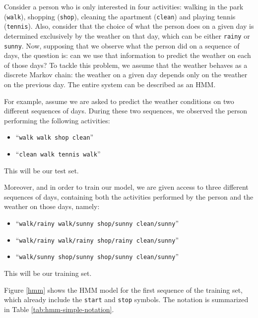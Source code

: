 \begin{example}

Consider a person who is only interested in four activities: walking in the park ({\tt walk}), shopping ({\tt shop}), cleaning the apartment ({\tt clean}) and playing tennis ({\tt tennis}).
Also, consider that the choice of what the person does on a given day is determined exclusively by the weather on that day, which can be either {\tt rainy} or {\tt sunny}. 
Now, supposing that we observe what the person did on a sequence of days, the question is: 
can we use that information to predict the weather on each of those days? 
To tackle this problem, we assume 
that the weather behaves as a discrete Markov chain: the weather on a
given day depends only on 
the weather on the previous day. 
The entire system can be described as an HMM.

For example, assume we are asked to predict the weather conditions on two different
sequences of days. During these two sequences, we observed the person performing the following activities: 
\begin{itemize}
\item ``{\tt walk walk shop clean}'' 
\item ``{\tt clean walk tennis walk}''
\end{itemize}
This will be our test set.

Moreover, and in order to train our model, we are given access to three different sequences of days, containing both the activities performed by the person and the weather on those days, namely: 
\begin{itemize}
\item ``{\tt walk/rainy walk/sunny shop/sunny clean/sunny}'' 
\item ``{\tt walk/rainy walk/rainy shop/rainy clean/sunny}''
\item ``{\tt walk/sunny shop/sunny shop/sunny clean/sunny}''
\end{itemize}
This will be our training set.


Figure \ref{hmm} shows the HMM model for the first sequence of the training set, which already include the {\tt start} and 
{\tt stop} symbols. The notation is summarized in Table \ref{tab:hmm-simple-notation}.
\end{example}
 

